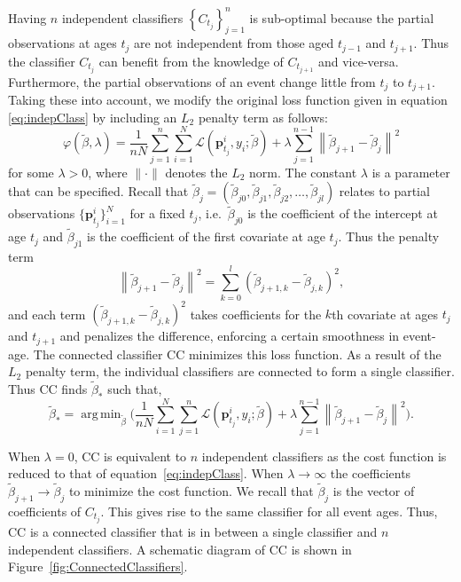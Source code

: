 \documentclass[a4paper,11pt]{article}
\DeclareMathOperator*{\argmin}{arg\,min}
\begin{document}
Having $n$ independent classifiers $\left\{C_{t_j}\right\}_{j=1}^n$ is sub-optimal because the partial observations at ages $t_j$ are not  independent from those aged $t_{j-1}$ and $t_{j+1}$. Thus  the classifier $C_{t_j}$ can benefit from the knowledge of $C_{t_{j+1}}$ and vice-versa. Furthermore, the partial observations of an event change little from $t_j$ to $t_{j+1}$. Taking these into account,  we modify the original loss function given in equation \eqref{eq:indepClass} by including an $L_2$ penalty term as follows:
\begin{equation}\label{eq:ExtParCl_1}
	\varphi(\tilde{\beta}, \lambda ) = \frac{1}{nN} \sum_{j=1}^n  \sum_{i=1}^N \mathscr{L} ( \bm{p}^i_{t_j},y_i;\tilde{\beta} ) + \lambda \sum_{j=1}^{n-1} \left\lVert \tilde{\beta}_{j+1} - \tilde{\beta}_{j} \right\rVert ^2
\end{equation}
for some $\lambda >0 $, where $\lVert \cdot \rVert$ denotes the $L_2$ norm. The constant $\lambda$ is a parameter that can be specified. Recall that $\tilde{\beta}_j = \left(\tilde{\beta}_{j0}, \tilde{\beta}_{j1}, \tilde{\beta}_{j2}, \dots, \tilde{\beta}_{jl} \right)$ relates to partial observations $\{ \bm{p}^i_{t_j}\}_{i=1}^N$ for a fixed $t_j$, i.e.\ $\tilde{\beta}_{j0}$ is the coefficient of the intercept at age $t_j$ and $\tilde{\beta}_{j1}$ is the coefficient of the first covariate at age $t_j$. Thus the penalty term
\[
	\left\lVert \tilde{\beta}_{j+1} - \tilde{\beta}_{j} \right\rVert ^2 = \sum_{k=0}^l (\tilde{\beta}_{j+1,k} - \tilde{\beta}_{j,k})^2  ,
\]
and each term $(\tilde{\beta}_{j+1,k} - \tilde{\beta}_{j,k})^2$ takes coefficients for the $k$th covariate at ages $t_j$ and $t_{j+1}$ and penalizes the difference, enforcing a certain smoothness in event-age. The connected classifier CC minimizes this loss function. As a result of the $L_2$ penalty term, the individual classifiers are connected to form a single  classifier. Thus CC finds $\tilde{\beta}_*$ such that,
\begin{equation}\label{eq:ExtParCl_2}
	\tilde{\beta}_* = 	\argmin_{\tilde{\beta}} \bigg( \frac{1}{nN} \sum_{i=1}^N \sum_{j=1}^n \mathscr{L} ( \bm{p}^i_{t_j},y_i;\tilde{\beta} ) + \lambda \sum_{j=1}^{n-1} \left\lVert \tilde{\beta}_{j+1} - \tilde{\beta}_{j} \right\rVert ^2 \bigg)  .
\end{equation}

When $\lambda = 0$, CC is equivalent to $n$ independent classifiers as the cost function is reduced to that of equation~\eqref{eq:indepClass}. When $\lambda \to \infty$ the coefficients $\tilde{\beta}_{j+1} \to \tilde{\beta}_j$ to minimize the cost function. We recall that $\tilde{\beta}_j$ is the vector of coefficients of $C_{t_j}$. This gives rise to the same classifier for all event ages. Thus, CC is a connected classifier that is in between a single classifier and $n$ independent classifiers. A schematic diagram of CC is shown in Figure~\ref{fig:ConnectedClassifiers}.
\end{document}

